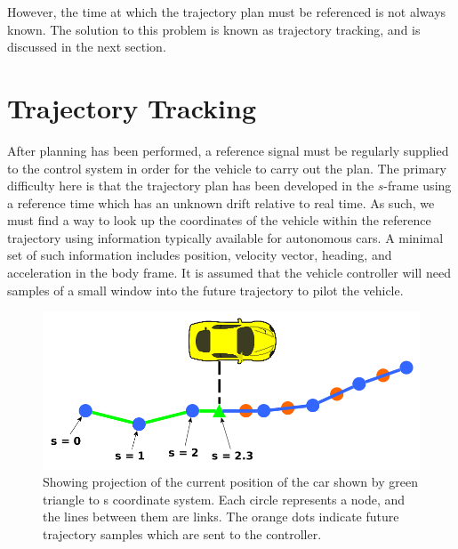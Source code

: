 \documentclass[letterpaper, 10 pt, conference]{ieeeconf}  %
\begin{document}

However, the time at which the trajectory plan must be referenced is not always known.
The solution to this problem is known as trajectory tracking, and is discussed in the next section.



\section{Trajectory Tracking} \label{sec:trajectorytracking}

After planning has been performed, a reference signal must be regularly supplied to the control system in order for the vehicle to carry out the plan.
The primary difficulty here is that the trajectory plan has been developed in the $s$-frame using a reference time which has an unknown drift relative to real time.
As such, we must find a way to look up the coordinates of the vehicle within the reference trajectory using information typically available for autonomous cars.
A minimal set of such information includes position, velocity vector, heading, and acceleration in the body frame.
It is assumed that the vehicle controller will need samples of a small window into the future trajectory to pilot the vehicle.

\begin{figure}[thpb]
  \centering
  \includegraphics[width=0.65\columnwidth]{graphics/PathProjectionSlice.png}
  \caption{Showing projection of the current position of the car shown by green triangle to s coordinate system. Each circle represents a node, and the lines between them are links. The orange dots indicate future trajectory samples which are sent to the controller.
  }

  \label{fig:cartos}
\end{figure}
\end{document}

